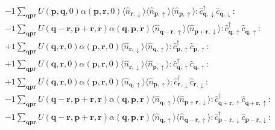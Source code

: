 \begin{align*}
	&-1 \sum_{ \mathbf{q} \mathbf{p} \mathbf{r} } U( \mathbf{p}, \mathbf{q}, 0 )  \alpha( \mathbf{p}, \mathbf{r}, 0 )   \langle \hat{n}_{ \mathbf{r}, \downarrow } \rangle \langle \hat{n}_{ \mathbf{p}, \uparrow } \rangle \langle \hat{n}_{ \mathbf{p}, \uparrow } \rangle :\hat{c}_{ \mathbf{q}, \downarrow }^\dagger \hat{c}_{ \mathbf{q}, \downarrow }^{\phantom{\dagger}}: \\
	&-1 \sum_{ \mathbf{q} \mathbf{p} \mathbf{r} } U( \mathbf{q}-\mathbf{r}, \mathbf{p}+\mathbf{r}, \mathbf{r} )  \alpha( \mathbf{q}, \mathbf{p}, \mathbf{r} )   \langle \hat{n}_{ \mathbf{q}-\mathbf{r}, \uparrow } \rangle \langle \hat{n}_{ \mathbf{p}+\mathbf{r}, \downarrow } \rangle :\hat{c}_{ \mathbf{q}, \uparrow }^\dagger \hat{c}_{ \mathbf{q}, \uparrow }^{\phantom{\dagger}}: \\
	&+1 \sum_{ \mathbf{q} \mathbf{p} \mathbf{r} } U( \mathbf{q}, \mathbf{r}, 0 )  \alpha( \mathbf{p}, \mathbf{r}, 0 )   \langle \hat{n}_{ \mathbf{r}, \downarrow } \rangle \langle \hat{n}_{ \mathbf{q}, \uparrow } \rangle :\hat{c}_{ \mathbf{p}, \uparrow }^\dagger \hat{c}_{ \mathbf{p}, \uparrow }^{\phantom{\dagger}}: \\
	&+1 \sum_{ \mathbf{q} \mathbf{p} \mathbf{r} } U( \mathbf{q}, \mathbf{r}, 0 )  \alpha( \mathbf{p}, \mathbf{r}, 0 )   \langle \hat{n}_{ \mathbf{r}, \downarrow } \rangle \langle \hat{n}_{ \mathbf{p}, \uparrow } \rangle :\hat{c}_{ \mathbf{q}, \uparrow }^\dagger \hat{c}_{ \mathbf{q}, \uparrow }^{\phantom{\dagger}}: \\
	&+1 \sum_{ \mathbf{q} \mathbf{p} \mathbf{r} } U( \mathbf{q}, \mathbf{r}, 0 )  \alpha( \mathbf{p}, \mathbf{r}, 0 )   \langle \hat{n}_{ \mathbf{q}, \uparrow } \rangle \langle \hat{n}_{ \mathbf{p}, \uparrow } \rangle :\hat{c}_{ \mathbf{r}, \downarrow }^\dagger \hat{c}_{ \mathbf{r}, \downarrow }^{\phantom{\dagger}}: \\
	&-1 \sum_{ \mathbf{q} \mathbf{p} \mathbf{r} } U( \mathbf{q}-\mathbf{r}, \mathbf{p}+\mathbf{r}, \mathbf{r} )  \alpha( \mathbf{q}, \mathbf{p}, \mathbf{r} )   \langle \hat{n}_{ \mathbf{q}, \uparrow } \rangle \langle \hat{n}_{ \mathbf{p}+\mathbf{r}, \downarrow } \rangle :\hat{c}_{ \mathbf{q}+\mathbf{r}, \uparrow }^\dagger \hat{c}_{ \mathbf{q}+\mathbf{r}, \uparrow }^{\phantom{\dagger}}: \\
	&-1 \sum_{ \mathbf{q} \mathbf{p} \mathbf{r} } U( \mathbf{q}-\mathbf{r}, \mathbf{p}+\mathbf{r}, \mathbf{r} )  \alpha( \mathbf{q}, \mathbf{p}, \mathbf{r} )   \langle \hat{n}_{ \mathbf{q}, \uparrow } \rangle \langle \hat{n}_{ \mathbf{q}-\mathbf{r}, \uparrow } \rangle :\hat{c}_{ \mathbf{p}-\mathbf{r}, \downarrow }^\dagger \hat{c}_{ \mathbf{p}-\mathbf{r}, \downarrow }^{\phantom{\dagger}}: \\

\end{align*}
